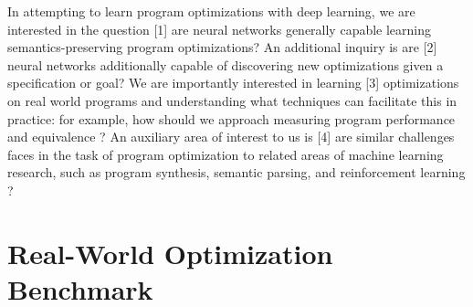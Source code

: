 \documentclass{article}
\begin{document}

In attempting to learn program optimizations with deep learning, we are interested in the question [1] are neural networks generally capable learning semantics-preserving program optimizations? An additional inquiry is are [2] neural networks additionally capable of discovering new optimizations given a specification or goal? We are importantly interested in learning [3] optimizations on real world programs and understanding what techniques can facilitate this in practice: for example, how should we approach measuring program performance and equivalence ? An auxiliary area of interest to us is [4] are similar challenges faces in the task of program optimization to related areas of machine learning research, such as program synthesis, semantic parsing, and reinforcement learning ?  

\section{Real-World Optimization Benchmark}
\label{sec:benchmark}





\end{document}
